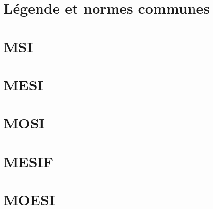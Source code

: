 \section{Légende et normes communes}

\section{MSI}

\section{MESI}

\section{MOSI}

\section{MESIF}

\section{MOESI}
